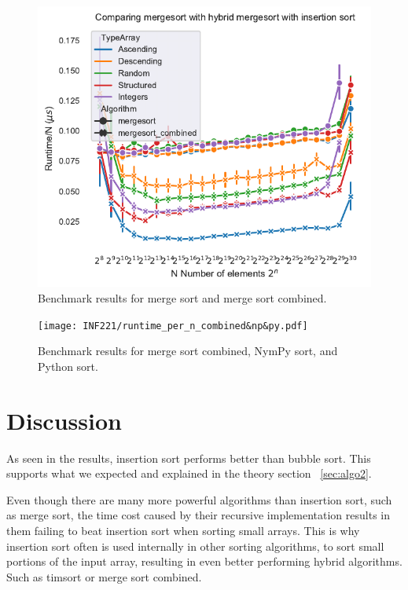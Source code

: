 \documentclass[sigconf, nonacm, natbib, screen, balance=False]{acmart}
\begin{document}
\begin{figure}[]
  \centering
  \includegraphics[scale=0.85]{runtime_per_n_merge&combined.pdf}
  \caption{Benchmark results for merge sort and merge sort combined.}
  \label{fig:merge_mergecomb}
\end{figure}

\begin{figure}[]
  \centering
  \texttt{[image: INF221/runtime\_per\_n\_combined\&np\&py.pdf]}
  \caption{Benchmark results for merge sort combined, NymPy sort, and Python sort.}
  \label{fig:np_py_mergecomb}
\end{figure}

\section{Discussion}\label{sec:discussion}

As seen in the results, insertion sort performs better than bubble sort. This supports what we expected and explained in the theory section ~\ref{sec:algo2}. \newline

Even though there are many more powerful algorithms than insertion sort, such as merge sort, the time cost caused by their recursive implementation results in them failing to beat insertion sort when sorting small arrays. This is why insertion sort often is used internally in other sorting algorithms, to sort small portions of the input array, resulting in even better performing hybrid algorithms. Such as timsort or merge sort combined.
\end{document}
